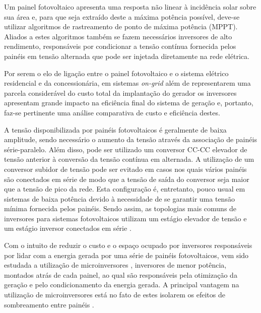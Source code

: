 \documentclass[
	12pt,				%
	openright,			%
	twoside,			%
	a4paper,			%
	english,			%
	french,				%
	spanish,			%
	brazil,				%
	]{abntex2}
\begin{document}
	Um painel fotovoltaico apresenta uma resposta não linear à incidência solar sobre sua área e, para que seja extraído deste 
	a máxima potência possível, deve-se utilizar algoritmos de rastreamento de ponto de máxima potência (MPPT). Aliados a 
	estes algoritmos também se fazem necessários inversores de alto rendimento, responsáveis por condicionar a tensão 
	contínua fornecida pelos painéis em tensão alternada que pode ser injetada diretamente na rede elétrica.
	
 
	Por serem o elo de ligação entre o painel fotovoltaico e o sistema elétrico residencial e da concessionária, em sistemas \textit{on-grid} além de representarem uma parcela considerável do custo total da implantação do gerador os inversores apresentam grande impacto na eficiência final do sistema de geração e, portanto, faz-se pertinente uma análise comparativa de custo e eficiência destes.


	A tensão disponibilizada por painéis fotovoltaicos é geralmente de baixa amplitude, sendo necessário o aumento da tensão através da associação de painéis série-paralelo. Além disso, pode ser utilizado um conversor CC-CC elevador de tensão anterior à conversão da tensão contínua em alternada. A utilização de um conversor subidor de tensão pode ser evitado em casos nos quais vários painéis são conectados em série de modo que a tensão de saída do conversor seja maior que a tensão de pico da rede. Esta configuração  é, entretanto, pouco usual em sistemas de baixa potência devido à necessidade de se garantir uma tensão mínima fornecida pelos painéis. Sendo assim, as topologias mais comuns de inversores para sistemas fotovoltaicos utilizam um estágio elevador de tensão e um estágio inversor conectados em série \cite{LUIGIJUNIOR_ev_int}.

	Com o intuito de reduzir o custo e o espaço ocupado por inversores responsáveis por lidar com a energia gerada por uma série de painéis fotovoltaicos, vem sido estudada a utilização de microinversores \cite{Bouzguenda_smart_grid_inv}, inversores de menor potência, montados atrás de cada painel, ao qual são responsáveis pela otimização da geração e pelo condicionamento da energia gerada. A principal vantagem na utilização de microinversores está no fato de estes isolarem os efeitos de sombreamento entre painéis \cite{Nezamuddin_des_eff_micro}.
\end{document}
